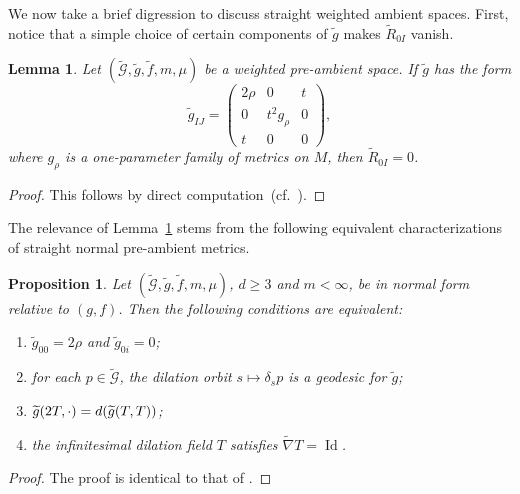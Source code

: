 \documentclass[11pt]{article}
\numberwithin{equation}{section}
\numberwithin{equation}{section}
\newtheorem{Lemma}[Theorem]{Lemma}
\newtheorem{Proposition}[Theorem]{Proposition}
 { \theoremstyle{definition}
\newtheorem{Definition}[Theorem]{Definition}
\newtheorem{Note}[Theorem]{Note}
\newtheorem{Example}[Theorem]{Example}
\newtheorem{Remark}[Theorem]{Remark} }
\begin{document}
We now take a brief digression to discuss straight weighted ambient spaces. First, notice that a simple choice of certain components of $\widetilde{g}$ makes $\widetilde{R}_{0I}$ vanish.

\begin{Lemma}
\label{straight-zero-theorem}
Let $(\widetilde{\mathcal{G}},\widetilde{g},\widetilde{f},m,\mu)$ be a weighted pre-ambient space. If $\widetilde{g}$ has the form
\begin{equation}
\label{straightmetric}
 \widetilde{g}_{IJ}=\begin{pmatrix} 2\rho&0&t\\0& t^2 g_{\rho}&0\\t&0&0 \end{pmatrix}\!,
\end{equation}
where $g_\rho$ is a one-parameter family of metrics on $M$, then $\widetilde{R}_{0I}=0$.
\end{Lemma}

\begin{proof}This follows by direct computation~(cf.\ \cite[Lemma 3.2]{FeffermanGraham2012}).
\end{proof}

The relevance of Lemma~\ref{straight-zero-theorem} stems from the following equivalent characterizations of straight normal pre-ambient metrics.
\begin{Proposition}
\label{straightproperties}
Let $(\widetilde{\mathcal{G}},\widetilde{g},\widetilde{f},m,\mu)$, $d\geq 3$ and $m<\infty$, be in normal form relative to $(g,f)$. Then the following conditions are equivalent:
\begin{enumerate}[label=$(\roman*)$]\itemsep=0pt
\item $\widetilde{g}_{00}=2\rho$ and $\widetilde{g}_{0i}=0$;

\item for each $p\in \widetilde{\mathcal{G}}$, the dilation orbit $s\mapsto \delta_s p$ is a geodesic for $\widetilde{g}$;

\item $\widetilde{g}(2T,\cdot)={\rm d}(\widetilde{g}(T,T))$;

\item the infinitesimal dilation field $T$ satisfies $\widetilde{\nabla}T=\operatorname{Id}$.
\end{enumerate}
\end{Proposition}

\begin{proof}
The proof is identical to that of \cite[Proposition 3.4]{FeffermanGraham2012}.
\end{proof}
\end{document}
